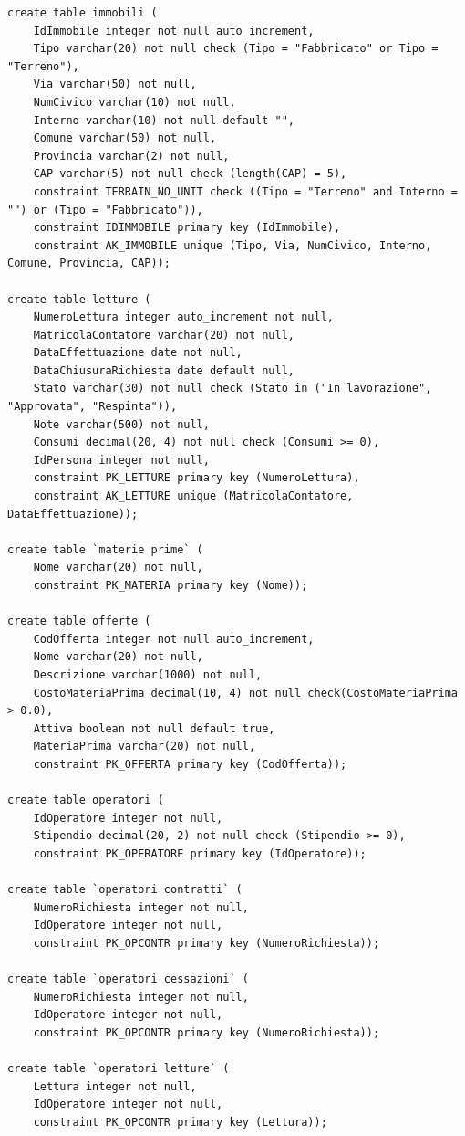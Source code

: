 \documentclass[a4paper,12pt]{report}
\begin{document}
\begin{lstlisting}
create table immobili (
    IdImmobile integer not null auto_increment,
    Tipo varchar(20) not null check (Tipo = "Fabbricato" or Tipo = "Terreno"),
    Via varchar(50) not null,
    NumCivico varchar(10) not null,
    Interno varchar(10) not null default "",
    Comune varchar(50) not null,
    Provincia varchar(2) not null,
    CAP varchar(5) not null check (length(CAP) = 5),
    constraint TERRAIN_NO_UNIT check ((Tipo = "Terreno" and Interno = "") or (Tipo = "Fabbricato")),
    constraint IDIMMOBILE primary key (IdImmobile),
    constraint AK_IMMOBILE unique (Tipo, Via, NumCivico, Interno, Comune, Provincia, CAP));

create table letture (
    NumeroLettura integer auto_increment not null,
    MatricolaContatore varchar(20) not null,
    DataEffettuazione date not null,
    DataChiusuraRichiesta date default null,
    Stato varchar(30) not null check (Stato in ("In lavorazione", "Approvata", "Respinta")),
    Note varchar(500) not null,
    Consumi decimal(20, 4) not null check (Consumi >= 0),
    IdPersona integer not null,
    constraint PK_LETTURE primary key (NumeroLettura),
    constraint AK_LETTURE unique (MatricolaContatore, DataEffettuazione));

create table `materie prime` (
    Nome varchar(20) not null,
    constraint PK_MATERIA primary key (Nome));

create table offerte (
    CodOfferta integer not null auto_increment,
    Nome varchar(20) not null,
    Descrizione varchar(1000) not null,
    CostoMateriaPrima decimal(10, 4) not null check(CostoMateriaPrima > 0.0),
    Attiva boolean not null default true,
    MateriaPrima varchar(20) not null,
    constraint PK_OFFERTA primary key (CodOfferta));

create table operatori (
    IdOperatore integer not null,
    Stipendio decimal(20, 2) not null check (Stipendio >= 0),
    constraint PK_OPERATORE primary key (IdOperatore));
    
create table `operatori contratti` (
    NumeroRichiesta integer not null,
    IdOperatore integer not null,
    constraint PK_OPCONTR primary key (NumeroRichiesta));
    
create table `operatori cessazioni` (
    NumeroRichiesta integer not null,
    IdOperatore integer not null,
    constraint PK_OPCONTR primary key (NumeroRichiesta));
    
create table `operatori letture` (
    Lettura integer not null,
    IdOperatore integer not null,
    constraint PK_OPCONTR primary key (Lettura));
    

\end{lstlisting}
\end{document}

